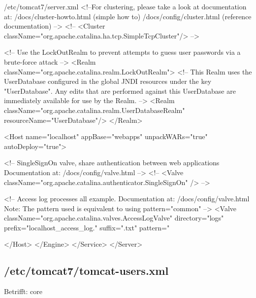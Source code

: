 \begin{lstdump}[basicstyle=\ttfamily\footnotesize]{/etc/tomcat7/server.xml}
      <!--For clustering, please take a look at documentation at:
          /docs/cluster-howto.html  (simple how to)
          /docs/config/cluster.html (reference documentation) -->
      <!--
      <Cluster className="org.apache.catalina.ha.tcp.SimpleTcpCluster"/>
      -->

      <!-- Use the LockOutRealm to prevent attempts to guess user passwords
           via a brute-force attack -->
      <Realm className="org.apache.catalina.realm.LockOutRealm">
        <!-- This Realm uses the UserDatabase configured in the global JNDI
             resources under the key "UserDatabase".  Any edits
             that are performed against this UserDatabase are immediately
             available for use by the Realm.  -->
        <Realm className="org.apache.catalina.realm.UserDatabaseRealm"
               resourceName="UserDatabase"/>
      </Realm>

      <Host name="localhost"  appBase="webapps"
            unpackWARs="true" autoDeploy="true">

        <!-- SingleSignOn valve, share authentication between web applications
             Documentation at: /docs/config/valve.html -->
        <!--
        <Valve className="org.apache.catalina.authenticator.SingleSignOn" />
        -->

        <!-- Access log processes all example.
             Documentation at: /docs/config/valve.html
             Note: The pattern used is equivalent to using pattern="common" -->
        <Valve className="org.apache.catalina.valves.AccessLogValve" directory="logs"
               prefix="localhost_access_log." suffix=".txt"
               pattern="%

      </Host>
    </Engine>
  </Service>
</Server>
\end{lstdump}

\subsection{/etc/tomcat7/tomcat-users.xml}\label{subsec:refcfg-tc-users}

\ifoa
Betrifft: core
\fi%

